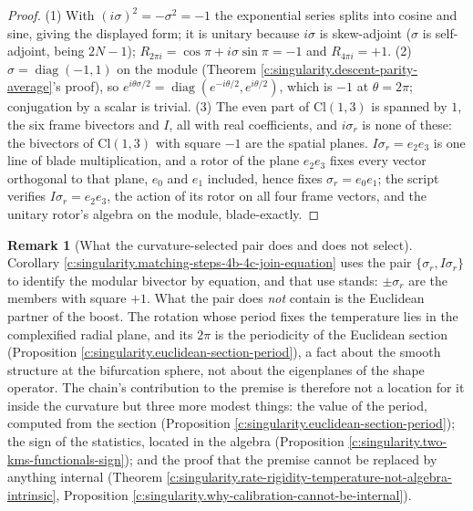 \documentclass[11pt]{article}
\theoremstyle{definition}
\newtheorem{remark}[theorem]{Remark}
\theoremstyle{plain}
\providecommand{\Cl}{}\renewcommand{\Cl}{\mathrm{Cl}}
\begin{document}
\begin{proof}
(1) With $(i\sigma)^{2} = -\sigma^{2} = -1$ the exponential series splits into cosine and sine, giving the displayed form; it is unitary because $i\sigma$ is skew-adjoint ($\sigma$ is self-adjoint, being $2N - 1$); $R_{2\pi i} = \cos\pi + i\sigma\sin\pi = -1$ and $R_{4\pi i} = +1$. (2) $\sigma = \operatorname{diag}(-1, 1)$ on the module (Theorem \ref{c:singularity.descent-parity-average}'s proof), so $e^{i\theta\sigma/2} = \operatorname{diag}(e^{-i\theta/2}, e^{i\theta/2})$, which is $-1$ at $\theta = 2\pi$; conjugation by a scalar is trivial. (3) The even part of $\Cl(1,3)$ is spanned by $1$, the six frame bivectors and $I$, all with real coefficients, and $i\sigma_r$ is none of these: the bivectors of $\Cl(1,3)$ with square $-1$ are the spatial planes. $I\sigma_r = e_2e_3$ is one line of blade multiplication, and a rotor of the plane $e_2e_3$ fixes every vector orthogonal to that plane, $e_0$ and $e_1$ included, hence fixes $\sigma_r = e_0e_1$; the script verifies $I\sigma_r = e_2e_3$, the action of its rotor on all four frame vectors, and the unitary rotor's algebra on the module, blade-exactly.

\end{proof}

\begin{remark}[What the curvature-selected pair does and does not select]\label{c:note.singularity.what-curvature-selected-pair-does-does}
Corollary \ref{c:singularity.matching-steps-4b-4c-join-equation} uses the pair $\{\sigma_r, I\sigma_r\}$ to identify the modular bivector by equation, and that use stands: $\pm\sigma_r$ are the members with square $+1$. What the pair does \emph{not} contain is the Euclidean partner of the boost. The rotation whose period fixes the temperature lies in the complexified radial plane, and its $2\pi$ is the periodicity of the Euclidean section (Proposition \ref{c:singularity.euclidean-section-period}), a fact about the smooth structure at the bifurcation sphere, not about the eigenplanes of the shape operator. The chain's contribution to the premise is therefore not a location for it inside the curvature but three more modest things: the value of the period, computed from the section (Proposition \ref{c:singularity.euclidean-section-period}); the sign of the statistics, located in the algebra (Proposition \ref{c:singularity.two-kms-functionals-sign}); and the proof that the premise cannot be replaced by anything internal (Theorem \ref{c:singularity.rate-rigidity-temperature-not-algebra-intrinsic}, Proposition \ref{c:singularity.why-calibration-cannot-be-internal}).
\end{remark}
\end{document}
